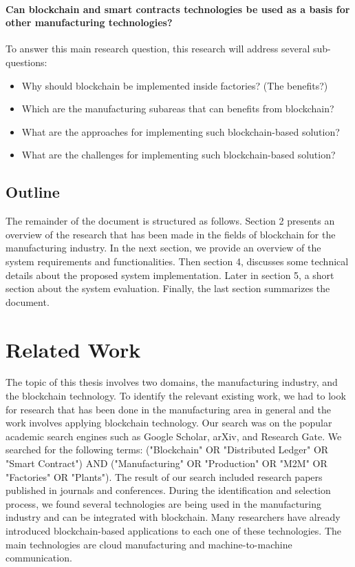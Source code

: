 \documentclass[runningheads]{llncs}
\begin{document}
\paragraph{Can blockchain and smart contracts technologies be used as a basis for other manufacturing technologies?} To answer this main research question, this research will address several sub-questions:
\begin{itemize}
  \item Why should blockchain be implemented inside factories? (The benefits?)
  \item Which are the manufacturing subareas that can benefits from blockchain?
  \item What are the approaches for implementing such blockchain-based solution? 
  \item What are the challenges for implementing such blockchain-based solution? 
\end{itemize}

\subsection{Outline}
The remainder of the document is structured as follows. Section 2 presents an overview of the research that has been made in the fields of blockchain for the manufacturing industry. In the next section, we provide an overview of the system requirements and functionalities. Then section 4, discusses some technical details about the proposed system implementation. Later in section 5, a short section about the system evaluation. Finally, the last section summarizes the document. 

\newpage

\section{Related Work}
The topic of this thesis involves two domains, the manufacturing industry, and the blockchain technology. To identify the relevant existing work, we had to look for research that has been done in the manufacturing area in general and the work involves applying blockchain technology. Our search was on the popular academic search engines such as Google Scholar, arXiv, and Research Gate. We searched for the following terms: ("Blockchain" OR "Distributed Ledger" OR "Smart Contract") AND ("Manufacturing" OR "Production" OR "M2M" OR "Factories" OR "Plants").  The result of our search included research papers published in journals and conferences. During the identification and selection process, we found several technologies are being used in the manufacturing industry and can be integrated with blockchain. Many researchers have already introduced blockchain-based applications to each one of these technologies. The main technologies are cloud manufacturing and machine-to-machine communication.  
\bigbreak
\end{document}
